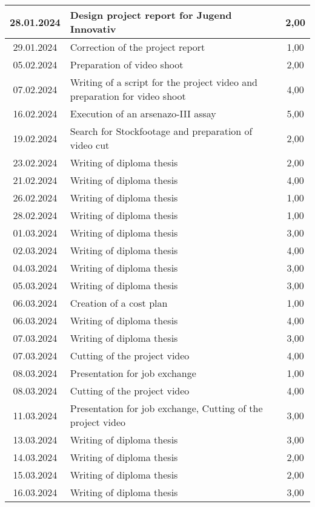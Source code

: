 \begin{longtable}{|c|p{9cm}|c|}
    28.01.2024 & Design project report for Jugend Innovativ & 2,00 \\ \hline
    29.01.2024 & Correction of the project report & 1,00 \\ \hline
    05.02.2024 & Preparation of video shoot & 2,00 \\ \hline
    07.02.2024 & Writing of a script for the project video and preparation for video shoot & 4,00 \\ \hline
    16.02.2024 & Execution of an arsenazo-III assay & 5,00 \\ \hline
    19.02.2024 & Search for Stockfootage and preparation of video cut & 2,00 \\ \hline
    23.02.2024 & Writing of diploma thesis & 2,00 \\ \hline
    21.02.2024 & Writing of diploma thesis & 4,00 \\ \hline
    26.02.2024 & Writing of diploma thesis & 1,00 \\ \hline
    28.02.2024 & Writing of diploma thesis & 1,00 \\ \hline
    01.03.2024 & Writing of diploma thesis & 3,00 \\ \hline
    02.03.2024 & Writing of diploma thesis & 4,00 \\ \hline
    04.03.2024 & Writing of diploma thesis & 3,00 \\ \hline
    05.03.2024 & Writing of diploma thesis & 3,00 \\ \hline
    06.03.2024 & Creation of a cost plan & 1,00 \\ \hline
    06.03.2024 & Writing of diploma thesis & 4,00 \\ \hline
    07.03.2024 & Writing of diploma thesis & 3,00 \\ \hline
    07.03.2024 & Cutting of the project video & 4,00 \\ \hline
    08.03.2024 & Presentation for job exchange & 1,00 \\ \hline
    08.03.2024 & Cutting of the project video & 4,00 \\ \hline
    11.03.2024 & Presentation for job exchange, Cutting of the project video & 3,00 \\ \hline
    13.03.2024 & Writing of diploma thesis & 3,00 \\ \hline
    14.03.2024 & Writing of diploma thesis & 2,00 \\ \hline
    15.03.2024 & Writing of diploma thesis & 2,00 \\ \hline
    16.03.2024 & Writing of diploma thesis & 3,00 \\ \hline

\end{longtable}


